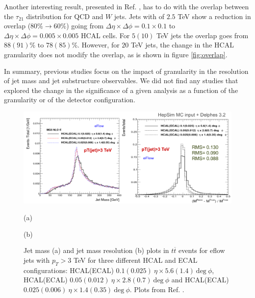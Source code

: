 Another interesting result, presented in Ref. \cite{BOOST2017}, has to do with the overlap between the $\tau_{21}$ distribution for QCD and $W$ jets. Jets with of $2.5$ TeV show a reduction in overlap ($80\%\rightarrow 60\%$) going from $\Delta\eta\times\Delta\phi=0.1\times 0.1$ to $\Delta\eta\times\Delta\phi=0.005\times 0.005$ HCAL cells. For $5(10)$ TeV jets the overlap goes from $88(91)\%$ to $78(85)\%$. However, for $20$ TeV jets, the change in the HCAL granularity does not modify the overlap, as is shown in figure \ref{fig:overlap}. 

In summary, previous studies focus on the impact of granularity in the resolution of jet mass and jet substructure observables. We did not find any studies that explored the change in the significance of a given analysis as a function of the granularity or of the detector configuration.

\begin{figure}
	\centering
	\includegraphics[width=\textwidth]{./Figures/hcal_gran_jet_mass.png}
	\begin{minipage}[t]{0.5\textwidth}
		\caption*{(a)}
	\end{minipage}%
	\hfill
	\begin{minipage}[t]{0.5\textwidth}
		\caption*{(b)}
	\end{minipage}
	\caption{Jet mass (a) and jet mass resolution (b) plots in $t\overline{t}$ events for eflow jets with $p_T>3$ TeV for three different HCAL and ECAL configurations: HCAL(ECAL) $0.1(0.025)~\eta \times 5.6(1.4)~\text{deg}~\phi$, HCAL(ECAL) $0.05(0.012)~\eta \times 2.8(0.7)~\text{deg}~\phi$ and HCAL(ECAL) $0.025(0.006)~\eta \times 1.4(0.35)~\text{deg}~\phi$. Plots from Ref. \cite{BOOST2017}.}
	\label{fig:hcal_gran_jet_mass}
\end{figure}

